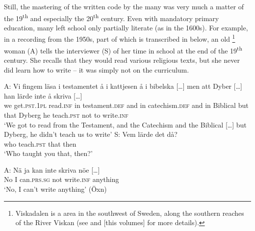 \documentclass[output=paper]{langscibook}
\begin{document}
Still, the mastering of the written code by the many was very much a matter of the 19\textsuperscript{th} and especially the 20\textsuperscript{th} century. Even with mandatory primary education, many left school only partially literate (as in the 1600s). For example, in a recording from the 1950s, part of which is transcribed in  below, an old \footnote{Viskadalen is a  area in the southwest of Sweden, along the southern reaches of the River Viskan (see \citealt{Petzell2017,Petzell2018} and \citeyear{chapters/07} [this volumes] for more details).} woman (A) tells the interviewer (S) of her time in school at the end of the 19\textsuperscript{th} century. She recalls that they would read various religious texts, but she never did learn how to write – it was simply not on the curriculum.


\ea \label{ex:intro:4}
\ea
\gll A:    Vi   fingem                  läsa             i     testamentet            å     i     kattjesen å     i     bibelska […] men att   Dyber […] han lärde inte   å   {skriva […]}\\
     {}     we   get.\textsc{pst.1pl}  read.\textsc{inf} in   testament.\textsc{def} and   in   catechism.\textsc{def} and   in   Biblical   {}       but   that Dyberg   {}    he   teach.\textsc{pst} not   to   write\textsc{.inf}\\
    \glt `We got to read from the Testament, and the Catechism and the Biblical […] but Dyberg, he didn’t teach us to write’
\ex
\gll S:     Vem   lärde       det   då?\\
     {}  who    teach.\textsc{pst}  that  then\\
    \glt `Who taught you that, then?’

\gll A:   Nä   ja   kan           inte     skriva     nöe […]\\
  {} No  I  can\textsc{.prs.sg}   not  write.\textsc{inf}   anything  \\
    \glt `No, I can’t write anything’ (Öxn)
\z
\z
\end{document}
